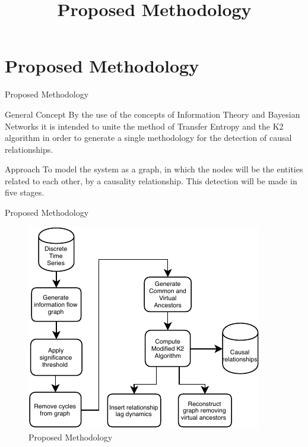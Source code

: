 \section{Proposed Methodology}
\title{Proposed Methodology}
\begin{frame}{Proposed Methodology}

	    
    	
    

    \begin{block}{General Concept}
        By the use of the concepts of Information Theory and Bayesian Networks it is intended to unite the method of Transfer Entropy and the K2 algorithm in order to generate a single methodology for the detection of causal relationships.
    \end{block}

    \begin{block}{Approach}
        To model  the system as a graph, in which the nodes will be the entities related to each other, by a causality
        relationship. This detection will be made in five stages.%
    \end{block}
\end{frame}

\begin{frame}{Proposed Methodology}
    \begin{figure}
        \includegraphics{figuras/methodology.pdf}
        \caption{Proposed Methodology}
    \end{figure}
\end{frame}

